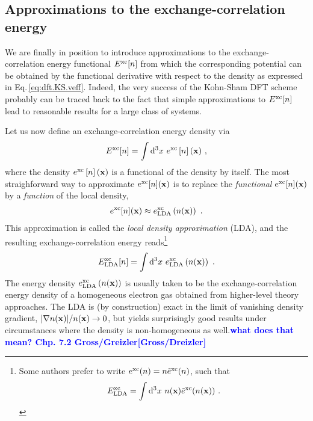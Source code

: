 \documentclass[a4paper,12pt]{book}
\renewcommand{\d}{{\rm d}}
\newcommand{\REM}[1]{\textcolor{blue}{{\bf #1}}}
\newcommand{\CITE}[1]{\textcolor{blue}{{\bf [#1]}}}
\begin{document}
\subsection{Approximations to the exchange-correlation energy}
We are finally in position to introduce approximations to the exchange-correlation energy functional $E^{\rm xc}[n]$ from which the corresponding potential can be obtained by the functional derivative with respect to the density as expressed in Eq.\,\eqref{eq:dft.KS.veff}. Indeed, the very success of the Kohn-Sham DFT scheme probably can be traced back to the fact that simple approximations to $E^{\rm xc}[n]$ lead to reasonable results for a large class of systems. 

Let us now define an exchange-correlation energy density via
\begin{align}
	E^{\rm xc}[n] 
		= \int \d^3 x ~ e^{\rm xc} \left[ n \right] ({\bf x})~,
\label{eq:dft.xc.1}
\end{align}
where the density $e^{\rm xc} \left[ n \right] ({\bf x})$ is a functional of the density by itself. 
The most straighforward way to approximate $e^{\rm xc}[n] ({\bf x})$ is to replace the \emph{functional} $e^{\rm xc} [n] ({\bf x})$ by a \emph{function} of the local density,
\begin{align}
	e^{\rm xc} [n] ({\bf x})
		\approx e^{\rm xc}_{\rm LDA} \left( n({\bf x}) \right)~.
	\label{eq:dft.exc.lda.1}
\end{align}
This approximation is called the \emph{local density approximation} (LDA), and the resulting exchange-correlation energy reads\footnote{
	Some authors prefer to write $e^{\rm xc}(n) = n \tilde e^{\rm xc} (n)$, such that
	\begin{align*}
		E^{\rm xc}_{\rm LDA} = \int \d^3 x ~ n({\bf x}) \tilde e^{\rm xc} (n ({\bf x}))~.
	\end{align*}}
\begin{align}
	E^{\rm xc}_{\rm LDA}[n] 
		= \int \d^3 x ~ e^{\rm xc}_{\rm LDA} \left(n ({\bf x}) \right)~.
	\label{eq:dft.LDA.1}
\end{align}
The energy density $e^{\rm xc}_{\rm LDA} \left(n ({\bf x}) \right)$ is usually taken to be the exchange-correlation energy density of a homogeneous electron gas obtained from higher-level theory approaches. The LDA is (by construction) exact in the limit of vanishing density gradient, $\lvert \nabla n ({\bf x}) \rvert / n({\bf x}) \rightarrow 0$, but yields surprisingly good results under circumstances where the density is non-homogeneous as well.\REM{what does that mean? Chp. 7.2 Gross/Greizler}\CITE{Gross/Dreizler}
\end{document}
